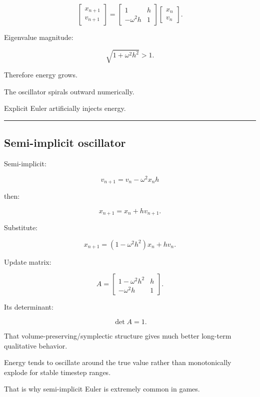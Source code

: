 \[
\begin{bmatrix}
x_{n+1}\\v_{n+1}
\end{bmatrix}
=
\begin{bmatrix}
1&h\\
-\omega^2h&1
\end{bmatrix}
\begin{bmatrix}
x_n\\v_n
\end{bmatrix}.
\]

Eigenvalue magnitude:

\[
\sqrt{1+\omega^2h^2}>1.
\]

Therefore energy grows.

The oscillator spirals outward numerically.

Explicit Euler artificially injects energy.

\begin{center}\rule{0.5\linewidth}{0.5pt}\end{center}

\subsection{Semi-implicit oscillator}\label{06-engine-ii-ch037-semi-implicit-oscillator}

\hypertarget{06-engine-ii-ch037-semi-implicit-oscillator}{}

Semi-implicit:

\[
v_{n+1}
=
v_n-\omega^2x_nh
\]

then:

\[
x_{n+1}
=
x_n+h v_{n+1}.
\]

Substitute:

\[
x_{n+1}
=
(1-\omega^2h^2)x_n+
hv_n.
\]

Update matrix:

\[
A=
\begin{bmatrix}
1-\omega^2h^2&h\\
-\omega^2h&1
\end{bmatrix}.
\]

Its determinant:

\[
\det A=1.
\]

That volume-preserving/symplectic structure gives much better long-term qualitative behavior.

Energy tends to oscillate around the true value rather than monotonically explode for stable timestep ranges.

That is why semi-implicit Euler is extremely common in games.

